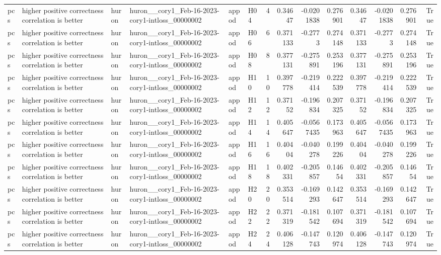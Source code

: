 \begin{longtable}{llllllrrrrrrrr}
pcs & higher positive correctness correlation is better & huron & huron\_\_cory1\_Feb-16-2023-cory1-intloss\_00000002 & appod & H04 & 4 & 0.34647 & -0.0201838 & 0.276901 & 0.34647 & -0.0201838 & 0.276901 & True \\
pcs & higher positive correctness correlation is better & huron & huron\_\_cory1\_Feb-16-2023-cory1-intloss\_00000002 & appod & H06 & 6 & 0.371133 & -0.2773 & 0.274148 & 0.371133 & -0.2773 & 0.274148 & True \\
pcs & higher positive correctness correlation is better & huron & huron\_\_cory1\_Feb-16-2023-cory1-intloss\_00000002 & appod & H08 & 8 & 0.377131 & -0.275891 & 0.253196 & 0.377131 & -0.275891 & 0.253196 & True \\
pcs & higher positive correctness correlation is better & huron & huron\_\_cory1\_Feb-16-2023-cory1-intloss\_00000002 & appod & H10 & 10 & 0.397778 & -0.219414 & 0.222539 & 0.397778 & -0.219414 & 0.222539 & True \\
pcs & higher positive correctness correlation is better & huron & huron\_\_cory1\_Feb-16-2023-cory1-intloss\_00000002 & appod & H12 & 12 & 0.37152 & -0.196834 & 0.207325 & 0.37152 & -0.196834 & 0.207325 & True \\
pcs & higher positive correctness correlation is better & huron & huron\_\_cory1\_Feb-16-2023-cory1-intloss\_00000002 & appod & H14 & 14 & 0.405647 & -0.0567435 & 0.173963 & 0.405647 & -0.0567435 & 0.173963 & True \\
pcs & higher positive correctness correlation is better & huron & huron\_\_cory1\_Feb-16-2023-cory1-intloss\_00000002 & appod & H16 & 16 & 0.40404 & -0.040278 & 0.199226 & 0.40404 & -0.040278 & 0.199226 & True \\
pcs & higher positive correctness correlation is better & huron & huron\_\_cory1\_Feb-16-2023-cory1-intloss\_00000002 & appod & H18 & 18 & 0.402331 & -0.205857 & 0.14654 & 0.402331 & -0.205857 & 0.14654 & True \\
pcs & higher positive correctness correlation is better & huron & huron\_\_cory1\_Feb-16-2023-cory1-intloss\_00000002 & appod & H20 & 20 & 0.353514 & -0.169293 & 0.142647 & 0.353514 & -0.169293 & 0.142647 & True \\
pcs & higher positive correctness correlation is better & huron & huron\_\_cory1\_Feb-16-2023-cory1-intloss\_00000002 & appod & H22 & 22 & 0.371319 & -0.181542 & 0.107694 & 0.371319 & -0.181542 & 0.107694 & True \\
pcs & higher positive correctness correlation is better & huron & huron\_\_cory1\_Feb-16-2023-cory1-intloss\_00000002 & appod & H24 & 24 & 0.406128 & -0.147743 & 0.120974 & 0.406128 & -0.147743 & 0.120974 & True \\

\end{longtable}
